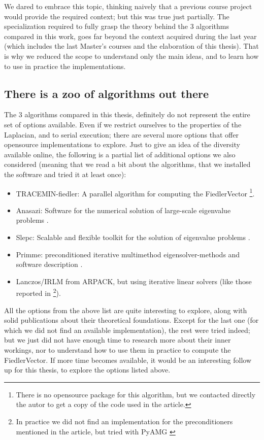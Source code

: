 We dared to embrace this topic, thinking naively that a previous
course project would provide the required context; but this was
true just partially. The specialization required to fully grasp the
theory behind the 3 algorithms compared in this work, goes far beyond
the context acquired during the last year (which includes the last
Master's courses and the elaboration of this thesis). That is why we
reduced the scope to understand only the main ideas, and to learn how
to use in practice the implementations.


\subsection{There is a zoo of algorithms out there}

The 3 algorithms compared in this thesis, definitely do not represent
the entire set of options available. Even if we restrict ourselves to
the properties of the \gls{Laplacian}, and to serial execution; there are
several more options that offer opensource implementations to
explore. Just to give an idea of the diversity available online, the
following is a partial list of additional options we also considered
(meaning that we read a bit about the algorithms, that we installed
the software and tried it at least once):

\begin{itemize}
  \item TRACEMIN-fiedler: A parallel algorithm for computing the
    \gls{FiedlerVector} \cite{trminfiedler} \footnote{There is no
      opensource package for this algorithm, but we contacted directly
    the autor to get a copy of the code used in the article.}.
  \item Anasazi: Software for the numerical solution of large-scale
    eigenvalue problems \cite{anasazi}.
  \item Slepc: Scalable and flexible toolkit for the solution of
    eigenvalue problems \cite{slepc}.
  \item Primme: preconditioned iterative multimethod
    eigensolver-methods and software description \cite{primme}.
  \item Lanczos/\gls{IRLM} from ARPACK, but using iterative linear solvers
    (like those reported in \cite{martinez16} \footnote{In practice we
  did not find an implementation for the preconditioners mentioned in
  the article, but tried with PyAMG \cite{pyamg}}). 
\end{itemize}

All the options from the above list are quite interesting to explore, 
along with solid publications about their theoretical
foundations. Except for the last one (for which we did not find an
available implementation), the rest were tried indeed; but we just did
not have enough time to research more about their inner workings, nor
to understand how to use them in practice to compute the
\gls{FiedlerVector}. If more time becomes available, it would be an interesting
follow up for this thesis, to explore the options listed above.

